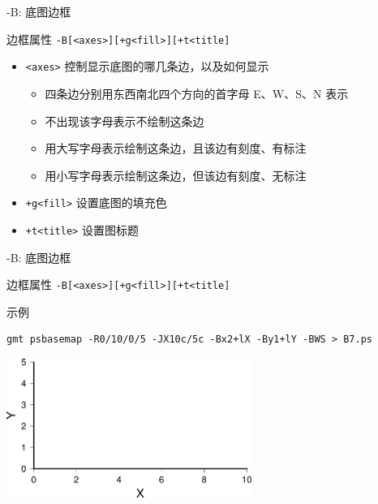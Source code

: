 \documentclass[UTF8, 11pt]{ctexbeamer}
\begin{document}
\begin{frame}[fragile]{-B: 底图边框}
\begin{block}{边框属性}
\small{\verb!-B[<axes>][+g<fill>][+t<title]!}
\end{block}
\begin{itemize}
\item \verb|<axes>| 控制显示底图的哪几条边，以及如何显示
    \begin{itemize}
    \item 四条边分别用东西南北四个方向的首字母 E、W、S、N 表示
    \item 不出现该字母表示不绘制这条边
    \item 用大写字母表示绘制这条边，且该边有刻度、有标注
    \item 用小写字母表示绘制这条边，但该边有刻度、无标注
    \end{itemize}
\item \verb|+g<fill>| 设置底图的填充色
\item \verb|+t<title>| 设置图标题
\end{itemize}
\end{frame}

\begin{frame}[fragile]{-B: 底图边框}
\begin{block}{边框属性}
\small{\verb!-B[<axes>][+g<fill>][+t<title]!}
\end{block}
\begin{block}{示例}
\centering
\small\begin{verbatim}
gmt psbasemap -R0/10/0/5 -JX10c/5c -Bx2+lX -By1+lY -BWS > B7.ps
\end{verbatim}
\includegraphics[width=0.6\textwidth]{GMT_B_example_7}
\end{block}
\end{frame}
\end{document}
